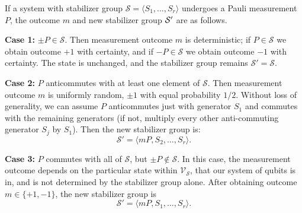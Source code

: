 \begin{theorem}\label{thm:stabilizer_group_update_measurement}
    If a system with stabilizer group $\mathcal{S} = \langle S_1, \ldots, S_r \rangle$ undergoes a Pauli measurement $P$, the outcome $m$ and new stabilizer group $\mathcal{S}'$ are as follows.

    \textbf{Case 1:}\label{thm:stabilizer_group_update_measurement:case1} $\pm P \in \mathcal{S}$.
    Then measurement outcome $m$ is deterministic; if $P \in \mathcal{S}$ we obtain outcome $+1$ with certainty, and if $-P \in \mathcal{S}$ we obtain outcome $-1$ with certainty.
    The state is unchanged, and the stabilizer group remains $\mathcal{S}' = \mathcal{S}$.

    \textbf{Case 2:}\label{thm:stabilizer_group_update_measurement:case2} $P$ anticommutes with at least one element of $\mathcal{S}$.
    Then measurement outcome $m$ is uniformly random, $\pm 1$ with equal probability $1/2$.
    Without loss of generality, we can assume $P$ anticommutes just with generator $S_1$ and commutes with the remaining generators (if not, multiply every other anti-commuting generator $S_j$ by $S_1$).
    Then the new stabilizer group is:
    \begin{equation}
        \mathcal{S}' = \langle mP, S_2, \ldots, S_r \rangle.
    \end{equation}

    \textbf{Case 3:}\label{thm:stabilizer_group_update_measurement:case3} $P$ commutes with all of $\mathcal{S}$, but $\pm P \notin \mathcal{S}$.
    In this case, the measurement outcome depends on the particular state within $\mathcal{V}_{\mathcal{S}}$, that our system of qubits is in, and is not determined by the stabilizer group alone.
    After obtaining outcome $m \in \{+1, -1\}$, the new stabilizer group is
    \begin{equation}
        \mathcal{S}' = \langle mP, S_1, \ldots, S_r \rangle.
    \end{equation}
\end{theorem}

